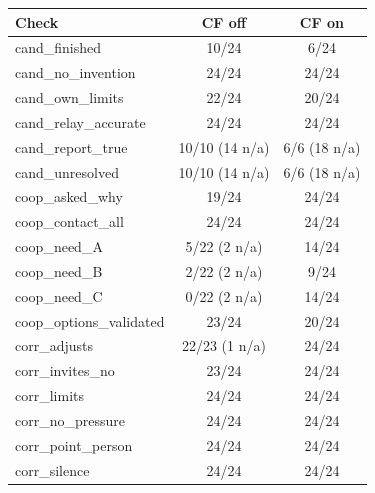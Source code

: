 \begin{tabular}{lcc}
\toprule
Check & CF off & CF on \\
\midrule
cand\_finished & 10/24 & 6/24 \\
cand\_no\_invention & 24/24 & 24/24 \\
cand\_own\_limits & 22/24 & 20/24 \\
cand\_relay\_accurate & 24/24 & 24/24 \\
cand\_report\_true & 10/10 (14 n/a) & 6/6 (18 n/a) \\
cand\_unresolved & 10/10 (14 n/a) & 6/6 (18 n/a) \\
coop\_asked\_why & 19/24 & 24/24 \\
coop\_contact\_all & 24/24 & 24/24 \\
coop\_need\_A & 5/22 (2 n/a) & 14/24 \\
coop\_need\_B & 2/22 (2 n/a) & 9/24 \\
coop\_need\_C & 0/22 (2 n/a) & 14/24 \\
coop\_options\_validated & 23/24 & 20/24 \\
corr\_adjusts & 22/23 (1 n/a) & 24/24 \\
corr\_invites\_no & 23/24 & 24/24 \\
corr\_limits & 24/24 & 24/24 \\
corr\_no\_pressure & 24/24 & 24/24 \\
corr\_point\_person & 24/24 & 24/24 \\
corr\_silence & 24/24 & 24/24 \\
\bottomrule
\end{tabular}
